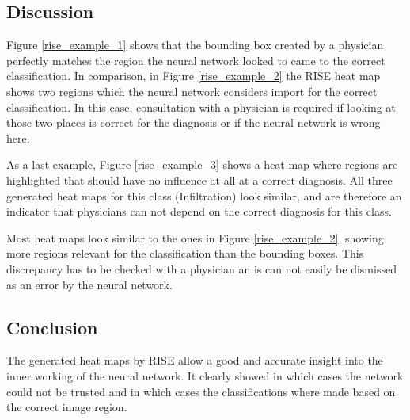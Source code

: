 \subsection{Discussion}
Figure \ref{rise_example_1} shows that the bounding box created by a physician perfectly matches the region the neural network looked to came to the correct classification. In comparison, in Figure \ref{rise_example_2} the RISE heat map shows two regions which the neural network considers import for the correct classification. In this case, consultation with a physician is required if looking at those two places is correct for the diagnosis or if the neural network is wrong here.

As a last example, Figure \ref{rise_example_3} shows a heat map where regions are highlighted that should have no influence at all at a correct diagnosis. All three generated heat maps for this class (Infiltration) look similar, and are therefore an indicator that physicians can not depend on the correct diagnosis for this class.

Most heat maps look similar to the ones in Figure \ref{rise_example_2}, showing more regions relevant for the classification than the bounding boxes. This discrepancy has to be checked with a physician an is can not easily be dismissed as an error by the neural network.

\subsection{Conclusion}
The generated heat maps by RISE allow a good and accurate insight into the inner working of the neural network. It clearly showed in which cases the network could not be trusted and in which cases the classifications where made based on the correct image region.
